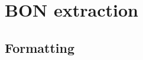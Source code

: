 \section{BON extraction}
\subsection{Formatting}
\label{why_interface_takes_care_of_formal_and_informal}